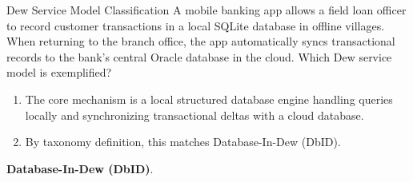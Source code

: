 \begin{solved}{Dew Service Model Classification}
\Given A mobile banking app allows a field loan officer to record customer transactions in a local SQLite database in offline villages. When returning to the branch office, the app automatically syncs transactional records to the bank's central Oracle database in the cloud. Which Dew service model is exemplified?
\Steps
\begin{enumerate}[leftmargin=*]
  \item The core mechanism is a local structured database engine handling queries locally and synchronizing transactional deltas with a cloud database.
  \item By taxonomy definition, this matches Database-In-Dew (DbID).
\end{enumerate}
\Answer \textbf{Database-In-Dew (DbID)}.
\end{solved}

